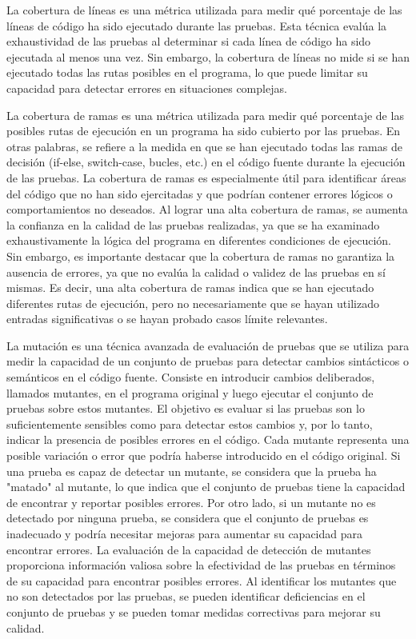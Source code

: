La cobertura de líneas es una métrica utilizada para medir qué porcentaje de las líneas de código ha sido ejecutado durante las pruebas. 
Esta técnica evalúa la exhaustividad de las pruebas al determinar si cada línea de código ha sido ejecutada al menos una vez. 
Sin embargo, la cobertura de líneas no mide si se han ejecutado todas las rutas posibles en el programa, lo que puede limitar su capacidad para detectar errores en situaciones complejas.

La cobertura de ramas es una métrica utilizada para medir qué porcentaje de las posibles rutas de ejecución en un programa ha sido cubierto por las pruebas. En otras palabras, se refiere a la medida en que se han ejecutado todas las ramas de decisión (if-else, switch-case, bucles, etc.) en el código fuente durante la ejecución de las pruebas. La cobertura de ramas es especialmente útil para identificar áreas del código que no han sido ejercitadas y que podrían contener errores lógicos o comportamientos no deseados.
Al lograr una alta cobertura de ramas, se aumenta la confianza en la calidad de las pruebas realizadas, ya que se ha examinado exhaustivamente la lógica del programa en diferentes condiciones de ejecución. Sin embargo, es importante destacar que la cobertura de ramas no garantiza la ausencia de errores, ya que no evalúa la calidad o validez de las pruebas en sí mismas. Es decir, una alta cobertura de ramas indica que se han ejecutado diferentes rutas de ejecución, pero no necesariamente que se hayan utilizado entradas significativas o se hayan probado casos límite relevantes.

La mutación es una técnica avanzada de evaluación de pruebas que se utiliza para medir la capacidad de un conjunto de pruebas para detectar cambios sintácticos o semánticos en el código fuente. Consiste en introducir cambios deliberados, llamados mutantes, en el programa original y luego ejecutar el conjunto de pruebas sobre estos mutantes. El objetivo es evaluar si las pruebas son lo suficientemente sensibles como para detectar estos cambios y, por lo tanto, indicar la presencia de posibles errores en el código.
Cada mutante representa una posible variación o error que podría haberse introducido en el código original. Si una prueba es capaz de detectar un mutante, se considera que la prueba ha "matado" al mutante, lo que indica que el conjunto de pruebas tiene la capacidad de encontrar y reportar posibles errores. Por otro lado, si un mutante no es detectado por ninguna prueba, se considera que el conjunto de pruebas es inadecuado y podría necesitar mejoras para aumentar su capacidad para encontrar errores.
La evaluación de la capacidad de detección de mutantes proporciona información valiosa sobre la efectividad de las pruebas en términos de su capacidad para encontrar posibles errores. Al identificar los mutantes que no son detectados por las pruebas, se pueden identificar deficiencias en el conjunto de pruebas y se pueden tomar medidas correctivas para mejorar su calidad.

